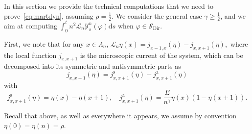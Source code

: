 \documentclass[10pt]{amsart}
\theoremstyle{definition}\newtheorem{defi}[theo]{Definition}\newtheorem{rema}[theo]{Remark}\newtheorem{exam}[theo]{Example}\newtheorem{exem}[theo]{Example}\newtheorem{nota}[theo]{Notation}
\DeclareMathOperator{\Dir}{Dir}
\newcommand*{\rms}{\mathrm{s}}
\newcommand*{\rma}{\mathrm{a}}
\newcommand{\mc}[1]{{\mathcal #1}}
\renewcommand{\mc}[1]{{\mathcal #1}}
\newcommand{\SD}{\ensuremath{\mc S_{\Dir}}}
\renewcommand{\geq}{\geqslant}
\newcommand*{\dd}{\mathrm{d}}
\newcommand*{\ds}{\dd s}
\begin{document}
In this section we provide the technical computations that we need to prove~\eqref{eq:martdyn}, assuming $\rho=\frac12$. We consider the general case $\gamma \geq \frac12$, and we aim at computing $\int_0^t n^2\mc L_n \mc Y_s^n(\varphi)\ds$ when $\varphi \in \SD$.

First, we note that for any $x\in\Lambda_n$, $
\mathcal L_n \eta(x)=j_{x-1,x}(\eta)-j_{x,x+1}(\eta), $ where the local function $j_{x,x+1}$ is the microscopic current of the system, which can be decomposed into its symmetric and antisymmetric parts as
\[
j_{x,x+1}(\eta)=j^{\rms}_{x,x+1}(\eta)+j^{\rma}_{x,x+1}(\eta)
\]
with
\[
j^{\rms}_{x,x+1}(\eta) =\eta(x)-\eta(x+1), \quad j^{\rma}_{x,x+1}(\eta)=\frac{E}{n^\gamma}\eta(x)(1-\eta(x+1)).
\]

Recall that above, as well as everywhere it appears, we assume by convention $\eta(0)=\eta(n)=\rho$.
\end{document}
